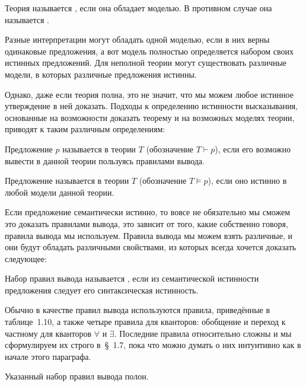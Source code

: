 \begin{definition}
Теория называется , если она обладает моделью. В противном случае она называется .
\end{definition}

Разные интерпретации могут обладать одной моделью, если в них верны одинаковые предложения, а вот модель полностью определяется набором своих истинных предложений. Для неполной теории могут существовать различные модели, в которых различные предложения истинны.

Однако, даже если теория полна, это не значит, что мы можем любое истинное утверждение в ней доказать. Подходы к определению истинности высказывания, основанные на возможности доказать теорему и на возможных моделях теории, приводят к таким различным определениям:

\begin{definition}
Предложение $p$ называется  в теории $T$ (обозначение $T\vdash p$), если его возможно вывести в данной теории пользуясь правилами вывода.
\end{definition}

\begin{definition}
Предложение называется  в теории $T$ (обозначение $T\models p$), если оно истинно в любой модели данной теории.
\end{definition}

Если предложение семантически истинно, то вовсе не обязательно мы сможем это доказать правилами вывода, это зависит от того, какие собственно говоря, правила вывода мы используем. Правила вывода мы можем взять различные, и они будут обладать различными свойствами, из которых всегда хочется доказать следующее:

\begin{definition}
Набор правил вывода называется , если из семантической истинности предложения следует его синтаксическая истинность.
\end{definition}

Обычно в качестве правил вывода используются правила, приведённые в таблице~1.10, а также четыре правила для кванторов: обобщение и переход к частному для кванторов $\forall$ и $\exists$. Последние правила относительно сложны и мы сформулируем их строго в~\S~1.7, пока что можно думать о них интуитивно как в начале этого параграфа.

\begin{GodelsCompleteness}
Указанный набор правил вывода полон.
\end{GodelsCompleteness}

